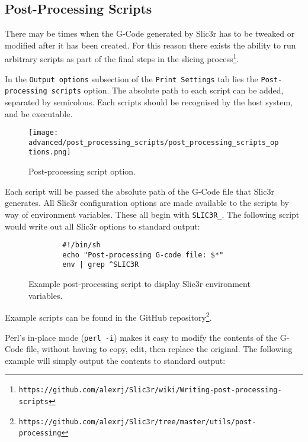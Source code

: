 
\subsection{Post-Processing Scripts} %
\label{sec:post_processing_scripts}

There may be times when the G-Code generated by Slic3r has to be tweaked or modified after it has been created.  For this reason there exists the ability to run arbitrary scripts as part of the final steps in the slicing process\footnote{\texttt{https://github.com/alexrj/Slic3r/wiki/Writing-post-processing-scripts}}.

In the \texttt{Output options} subsection of the \texttt{Print Settings} tab lies the \texttt{Post-processing scripts} option.  The absolute path to each script can be added, separated by semicolons. Each scripts should be recognised by the host system, and be executable.

\begin{figure}[H]
\centering
\texttt{[image: advanced/post\_processing\_scripts/post\_processing\_scripts\_options.png]}
\caption{Post-processing script option.}
\label{fig:post_processing_scripts_options}
\end{figure}

Each script will be passed the absolute path of the G-Code file that Slic3r generates.  All Slic3r configuration options are made available to the scripts by way of environment variables.  These all begin with \texttt{SLIC3R\_}.  The following script would write out all Slic3r options to standard output:

\begin{figure}[H]
\small
\begin{verbatim}
        #!/bin/sh
        echo "Post-processing G-code file: $*"
        env | grep ^SLIC3R
\end{verbatim}
\caption{Example post-processing script to display Slic3r environment variables.}
\label{fig:exaple_post_processing_script_env_vars}
\end{figure}

Example scripts can be found in the GitHub repository\footnote{\texttt{https://github.com/alexrj/Slic3r/tree/master/utils/post-processing}}.


Perl's in-place mode (\texttt{perl -i}) makes it easy to modify the contents of the G-Code file, without having to copy, edit, then replace the original.  The following example will simply output the contents to standard output:


